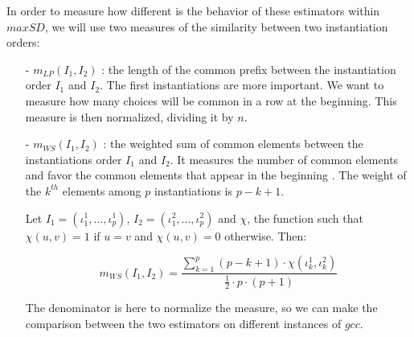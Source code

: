 \documentclass[jair,twoside,11pt,theapa]{article}
\newcommand{\noteGilles}[1]  {{\color{red}{\sc \scriptsize [Gilles: #1]}}}
\begin{document}
In order to measure how different is the behavior of these estimators within $maxSD$, we will use two measures of the similarity between two instantiation orders:
\noteGilles{Est-ce que ce sont des mesures maison? Si on considère pour chaque variable ses densités de solution comme une distribution discrète, il y a quelques mesures standard de similitude qu'on peut utiliser, dont la divergence de Kullback-Leibler. On prendrait ensuite la moyenne de cette divergence sur l'ensemble des variables.}
\begin{itemize}
\item[-] $m_{LP}(I_1, I_2)$ : the length of the common prefix between the instantiation order $I_1$ and $I_2$. The first instantiations are more important. We want to measure how many choices will be common in a row at the beginning. This measure is then normalized, dividing it by $n$.

\item[-] $m_{WS}(I_1, I_2)$ : the weighted sum of common elements between the instantiations order $I_1$ and $I_2$. It measures the number of common elements and favor the common elements that appear in the beginning . The weight of the $k^{th}$ elements among $p$ instantiations is $p-k+1$.

Let $I_1 = (\iota^1_1, \ldots, \iota^1_p)$, $I_2 = (\iota^2_1, \ldots, \iota^2_p)$ and $\chi$, the function such that $\chi(u,v)=1$ if $u=v$ and $\chi(u,v)=0$ otherwise. Then:

\begin{equation*}
	m_{WS}(I_1, I_2) = \frac{\sum_{k=1}^p (p-k+1)\cdot \chi(\iota^1_k, \iota^2_k)}{\frac{1}{2}\cdot p\cdot(p+1)}
\end{equation*}

The denominator is here to normalize the measure, so we can make the comparison between the two estimators on different instances of $gcc$.

\end{itemize}
\end{document}
